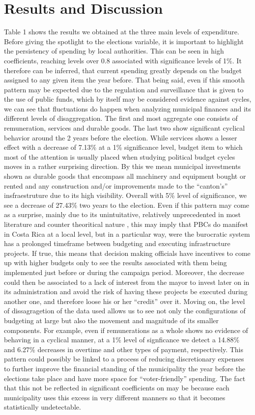 \section{Results and Discussion}
	Table 1 shows the results we obtained at the three main levels of expenditure. Before giving the spotlight to the elections variable, it is important to highlight the persistency of spending by local authorities. This can be seen in high coefficients, reaching levels over 0.8 associated with significance levels of 1\%. It therefore can be inferred, that current spending greatly depends on the budget assigned to any given item the year before. That being said, even if this smooth pattern may be expected due to the regulation and surveillance that is given to the use of public funds, which by itself may be considered evidence against cycles, we can see that fluctuations do happen when analyzing municipal finances and its different levels of disaggregation.
	The first and most aggregate one consists of remuneration, services and durable goods. The last two show significant cyclical behavior around the 2 years before the election. While services shows a lesser effect with a decrease of 7.13\% at a 1\% significance level, budget item to which most of the attention is usually placed when studying political budget cycles moves in a rather surprising direction. By this we mean municipal investments shown as durable goods that encompass all machinery and equipment bought or rented and any construction and/or improvements made to the “canton’s” insfraestruture due to its high visibility. Overall with 5\% level of significance, we see a decrease of 27.43\% two years to the election. 
	Even if this pattern may come as a surprise, mainly due to its unintuitative, relatively unprecedented in most literature and counter theoritical nature \textcite{nordhaus1975}, this may imply that PBCs do manifest in Costa Rica at a local level, but in a particular way, were the burocratic system has a prolonged timeframe between budgeting and executing infrastructure projects. If true, this means that decision making officials have incentives to come up with higher budgets only to see the results associated with them being implemented just before or during the campaign period. Moreover, the decrease could then be associated to a lack of interest from the mayor to invest later on in its administration and avoid the risk of having these projects be executed during another one, and therefore loose his or her “credit” over it. 
	Moving on, the level of dissagragetion of the data used allows us to see not only the configurations of budgeting at large but also the movement and magnitude of its smaller components. For example, even if remunerations as a whole shows no evidence of behaving in a cyclical manner, at a 1\% level of signficance we detect a 14.88\% and 6.27\% decreases in overtime and other types of payment, respectively. This pattern could possibly be linked to a process of reducing discretionary expenses to further improve the financial standing of the municipality the year before the elections take place and have more space for “voter-friendly” spending. The fact that this not be reflected in significant coefficients on may be because each municipality uses this excess in very different manners so that it becomes statistically undetectable. 
